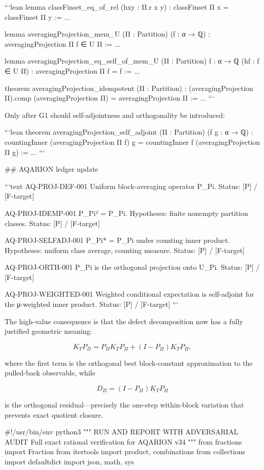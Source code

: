 ```lean
lemma classFinset_eq_of_rel
    (hxy : Π.r x y) :
    classFinset Π x = classFinset Π y := ...

lemma averagingProjection_mem_U
    (Π : Partition) (f : α → ℚ) :
    averagingProjection Π f ∈ U Π := ...

lemma averagingProjection_eq_self_of_mem_U
    (Π : Partition) {f : α → ℚ}
    (hf : f ∈ U Π) :
    averagingProjection Π f = f := ...

theorem averagingProjection_idempotent
    (Π : Partition) :
    (averagingProjection Π).comp (averagingProjection Π)
      = averagingProjection Π := ...
```

Only after G1 should self-adjointness and orthogonality be introduced:

```lean
theorem averagingProjection_self_adjoint
    (Π : Partition) (f g : α → ℚ) :
    countingInner (averagingProjection Π f) g
      =
    countingInner f (averagingProjection Π g) := ...
```

## AQARION ledger update

```text
AQ-PROJ-DEF-001
Uniform block-averaging operator P_Pi.
Status: [P] / [F-target]

AQ-PROJ-IDEMP-001
P_Pi² = P_Pi.
Hypotheses: finite nonempty partition classes.
Status: [P] / [F-target]

AQ-PROJ-SELFADJ-001
P_Pi* = P_Pi under counting inner product.
Hypotheses: uniform class average, counting measure.
Status: [P] / [F-target]

AQ-PROJ-ORTH-001
P_Pi is the orthogonal projection onto U_Pi.
Status: [P] / [F-target]

AQ-PROJ-WEIGHTED-001
Weighted conditional expectation is self-adjoint for the μ-weighted inner product.
Status: [P] / [F-target]
```

The high-value consequence is that the defect decomposition now has a fully justified geometric meaning:

$$
K_TP_\Pi
=
P_\Pi K_TP_\Pi
+
(I-P_\Pi)K_TP_\Pi,
$$

where the first term is the orthogonal best block-constant approximation to the pulled-back observable, while

$$
D_\Pi=(I-P_\Pi)K_TP_\Pi
$$

is the orthogonal residual—precisely the one-step within-block variation that prevents exact quotient closure.

#!/usr/bin/env python3
"""
RUN AND REPORT WITH ADVERSARIAL AUDIT
Full exact rational verification for AQARION v34
"""
from fractions import Fraction
from itertools import product, combinations
from collections import defaultdict
import json, math, sys


